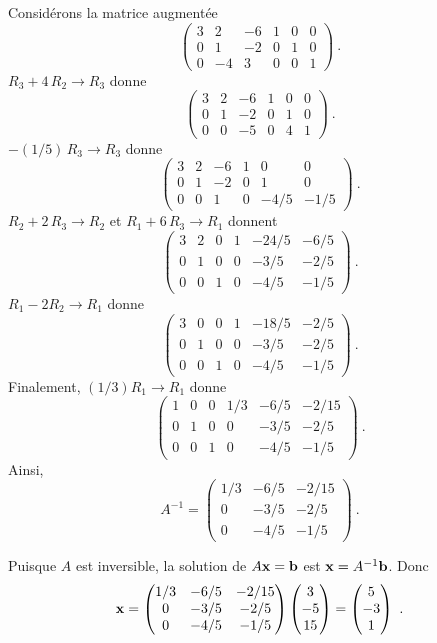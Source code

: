 { Considérons la matrice augmentée
\[
\left(\begin{array}{ccc|ccc}
3 & 2 & -6 & 1 & 0 & 0 \\ 0 & 1 & -2 & 0 & 1 & 0 \\ 0 & -4 & 3 & 0 & 0
& 1 \end{array}\right) \ .
\]
$R_3+4\,R_2 \rightarrow R_3$ donne
\[
\left(\begin{array}{ccc|ccc}
3 & 2 & -6 & 1 & 0 & 0 \\ 0 & 1 & -2 & 0 & 1 & 0 \\ 0 & 0 & -5 & 0 & 4
& 1 \end{array}\right) \ .
\]
$-(1/5)\,R_3 \rightarrow R_3$ donne
\[
\left(\begin{array}{ccc|ccc}
3 & 2 & -6 & 1 & 0 & 0 \\ 0 & 1 & -2 & 0 & 1 & 0 \\ 0 & 0 & 1 & 0 & -4/5
& -1/5 \end{array}\right) \ .
\]
$R_2+2\,R_3\rightarrow R_2$ et $R_1 +6\,R_3 \rightarrow R_1$ donnent
\[
\left(\begin{array}{ccc|ccc}
3 & 2 & 0 & 1 & -24/5 & -6/5 \\ 0 & 1 & 0 & 0 & -3/5 & -2/5
\\ 0 & 0 & 1 & 0 & -4/5 & -1/5 \end{array}\right) \ .
\]
$R_1-2R_2 \rightarrow R_1$ donne
\[
\left(\begin{array}{ccc|ccc}
3 & 0 & 0 & 1 & -18/5 & -2/5 \\ 0 & 1 & 0 & 0 & -3/5 & -2/5
\\ 0 & 0 & 1 & 0 & -4/5 & -1/5 \end{array}\right) \ .
\]
Finalement, $(1/3)R_1 \rightarrow R_1$ donne
\[
\left(\begin{array}{ccc|ccc}
1 & 0 & 0 & 1/3 & -6/5 & -2/15 \\ 0 & 1 & 0 & 0 & -3/5 & -2/5
\\ 0 & 0 & 1 & 0 & -4/5 & -1/5 \end{array}\right) \ .
\]
Ainsi,
\[
A^{-1} =
\begin{pmatrix}
1/3 & -6/5 & -2/15 \\ 0 & -3/5 & -2/5 \\ 0 & -4/5 & -1/5
\end{pmatrix} \ .
\]

 Puisque $A$ est inversible, la solution de $A\mathbf{x} =
\mathbf{b}$ est $\mathbf{x} = A^{-1}\mathbf{b}$.  Donc
\[
\mathbf{x} = 
\begin{pmatrix}
1/3 & -6/5 & -2/15 \\ 0 & -3/5 & -2/5 \\ 0 & -4/5 & -1/5
\end{pmatrix}
\begin{pmatrix} 3 \\ -5 \\ 15 \end{pmatrix}
= \begin{pmatrix} 5 \\ -3 \\ 1 \end{pmatrix} \ .
\]

}
